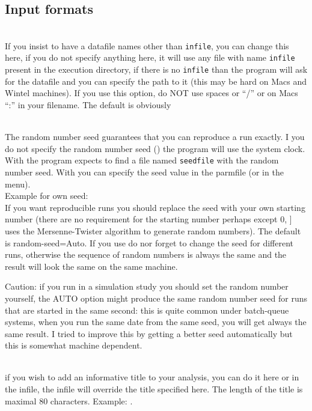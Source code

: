 \subsection{Input formats}
\begin{description}
\item{}\\
If you insist to have a datafile names other than {\tt infile}, you can change
this here, if you do not specify anything here, it will use any file
with name {\tt infile} present in the execution directory, if there is no
{\tt infile} than the program will ask for the datafile and 
you can specify the path to it (this may be hard on Macs and Wintel machines). 
If you use this option, do {\bt NOT} use spaces  or ``/'' or on Macs ``:''
in your filename. The default is obviously {}

\item {}\\
The random number seed guarantees that you can reproduce a run
exactly. I you do not specify the random number seed ()
the program will use the system clock. With {} the program expects to find a file named {\tt seedfile} with the random number seed.
With {} you can specify the seed value in the parmfile
(or in the menu). \\
Example for own seed:\\
If you want reproducible runs you should replace the {} seed with your own starting number (there are no requirement for the starting number perhaps except 0, ] \migrate uses the Mersenne-Twister algorithm to generate random numbers). 
The default is {\bt random-seed=Auto}. If you use
 {} do nor forget to change the seed for different runs,
otherwise the sequence of random numbers is always the same and the result will look the same on the same machine. 

Caution: if you run \migrate in a simulation study you should set the random number yourself, the AUTO option might produce the same random number seed for runs that are started in the same second: this is quite common under batch-queue systems, when you run the same date from the same seed, you will get always the same result. I tried to improve this by getting a better seed automatically but this is somewhat machine dependent.

\item{}\\
if you wish to add an informative title to your analysis,
you can do it here or in the infile, the infile will override
the title specified here. The length of the title is maximal 80 characters.
Example: {}.
\end{description}

